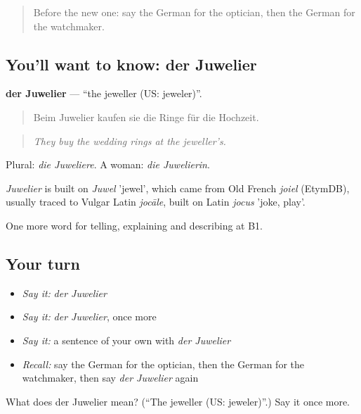 \label{lesson:GE-C447-juwelier}



\begin{quote}
Before the new one: say the German for the optician, then the German for the watchmaker.
\end{quote}

\subsection*{You'll want to know: der Juwelier}
\textbf{der Juwelier} — \textquotedblleft{}the jeweller (US: jeweler)\textquotedblright{}.

\begin{quote}
Beim Juwelier kaufen sie die Ringe für die Hochzeit.
\end{quote}

\begin{quote}
\emph{They buy the wedding rings at the jeweller's.}
\end{quote}

Plural: \emph{die Juweliere}. A woman: \emph{die Juwelierin}.

\begin{cousinweb}
\emph{Juwelier} is built on \emph{Juwel} 'jewel', which came from Old French \emph{joiel} (EtymDB), usually traced to Vulgar Latin \emph{jocāle}, built on Latin \emph{jocus} 'joke, play'.
\end{cousinweb}

\begin{grammarlens}[title={What you've built}]
One more word for telling, explaining and describing at B1.
\end{grammarlens}

\subsection*{Your turn}
\begin{itemize}
\raggedright
  \item \emph{Say it:} \emph{der Juwelier}
  \item \emph{Say it:} \emph{der Juwelier}, once more
  \item \emph{Say it:} a sentence of your own with \emph{der Juwelier}
  \item \emph{Recall:} say the German for the optician, then the German for the watchmaker, then say \emph{der Juwelier} again
\end{itemize}

\begin{tcolorbox}[breakable,colback=teal!4,colframe=teal!35!black,title={Before you move on}]
What does der Juwelier mean? (\textquotedblleft{}The jeweller (US: jeweler)\textquotedblright{}.) Say it once more.
\end{tcolorbox}
